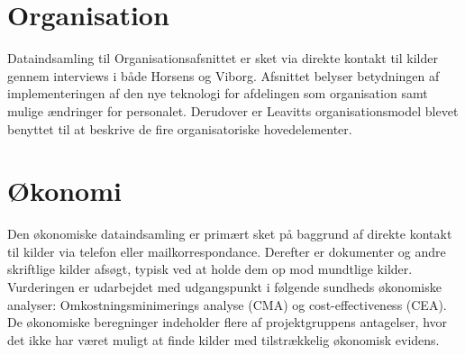 \section{Organisation}
Dataindsamling til Organisationsafsnittet er sket via direkte kontakt til kilder gennem interviews i både Horsens og Viborg. Afsnittet belyser betydningen af implementeringen af den nye teknologi for afdelingen som organisation samt mulige ændringer for personalet. Derudover er Leavitts organisationsmodel blevet benyttet til at beskrive de fire organisatoriske hovedelementer.

\section{Økonomi}
Den økonomiske dataindsamling er primært sket på baggrund af direkte kontakt til kilder via telefon eller mailkorrespondance. Derefter er dokumenter og andre skriftlige kilder afsøgt, typisk ved at holde dem op mod mundtlige kilder. Vurderingen er udarbejdet med udgangspunkt i følgende sundheds økonomiske analyser: Omkostningsminimerings analyse (CMA) og cost-effectiveness (CEA). De økonomiske beregninger indeholder flere af projektgruppens antagelser, hvor det ikke har været muligt at finde kilder med tilstrækkelig økonomisk evidens. 